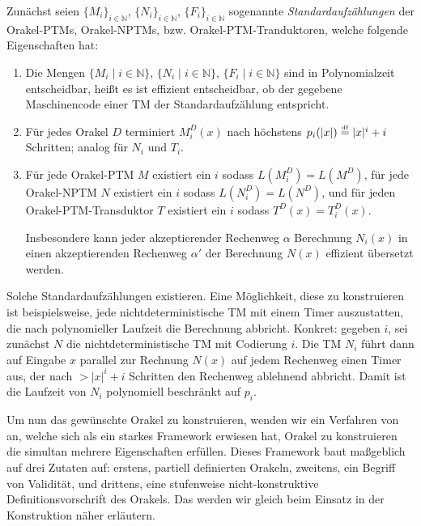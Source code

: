 Zunächst seien $\{M_i\}_{i\in \mathbb N}$, $\{N_i\}_{i\in \mathbb N}$, $\{F_i\}_{i\in\mathbb N}$ sogenannte \emph{Standardaufzählungen} der Orakel-PTMs, Orakel-NPTMs, bzw. Orakel-PTM-Tranduktoren, welche folgende Eigenschaften hat:
\begin{enumerate}[label=\arabic*.,nosep]
    \item Die Mengen $\{M_i \mid i\in\mathbb N\}$, $\{N_i \mid i\in\mathbb N\}$, $\{F_i \mid i\in\mathbb N\}$ sind in Polynomialzeit entscheidbar, heißt es ist effizient entscheidbar, ob der gegebene Maschinencode einer TM der Standardaufzählung entspricht.
    \item Für jedes Orakel $D$ terminiert $M_i^D(x)$ nach höchstens $p_i(|x|)\stackrel{\text{\smash{\tiny df}}}{=} |x|^i+i$ Schritten; analog für $N_i$ und $T_i$.
    \item Für jede Orakel-PTM $M$ existiert ein $i$ sodass $L(M^D_i)=L(M^D)$, 
        für jede Orakel-NPTM $N$ existiert ein $i$ sodass $L(N^D_i)=L(N^D)$, und
        für jeden Orakel-PTM-Transduktor $T$ existiert ein $i$ sodass $T^D(x)=T_i^D(x)$.

        Insbesondere kann jeder akzeptierender Rechenweg $\alpha$ Berechnung $N_i(x)$ in einen akzeptierenden Rechenweg $\alpha'$ der Berechnung $N(x)$ effizient übersetzt werden.
\end{enumerate}
Solche Standardaufzählungen existieren. Eine Möglichkeit, diese zu konstruieren ist beispielsweise, jede nichtdeterministische TM mit einem Timer auszustatten, die nach polynomieller Laufzeit die Berechnung abbricht. Konkret: gegeben $i$, sei zunächst $N$ die nichtdeterministische TM mit Codierung $i$. Die TM $N_i$ führt dann auf Eingabe $x$ parallel zur Rechnung $N(x)$ auf jedem Rechenweg einen Timer aus, der nach $>|x|^i+i$ Schritten den Rechenweg ablehnend abbricht.
Damit ist die Laufzeit von $N_i$ polynomiell beschränkt auf $p_i$.

Um nun das gewünschte Orakel zu konstruieren, wenden wir ein Verfahren von \textcite{dose_np-completeness_2019} an, welche sich als ein starkes Framework erwiesen hat, Orakel zu konstruieren die simultan mehrere Eigenschaften erfüllen. Dieses Framework baut maßgeblich auf drei Zutaten auf: erstens, partiell definierten Orakeln, zweitens, ein Begriff von Validität, und drittens, eine stufenweise nicht-konstruktive Definitionsvorschrift des Orakels.
Das werden wir gleich beim Einsatz in der Konstruktion näher erläutern.

